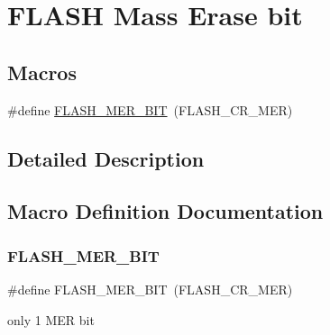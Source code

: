 \hypertarget{group___f_l_a_s_h_ex___mass_erase__bit}{}\section{F\+L\+A\+SH Mass Erase bit}
\label{group___f_l_a_s_h_ex___mass_erase__bit}
\subsection*{Macros}
\begin{DoxyCompactItemize}
\item 
\#define \mbox{\hyperlink{group___f_l_a_s_h_ex___mass_erase__bit_gae8edecf268bc993ff286fa1fabb486dd}{F\+L\+A\+S\+H\+\_\+\+M\+E\+R\+\_\+\+B\+IT}}~(F\+L\+A\+S\+H\+\_\+\+C\+R\+\_\+\+M\+ER)
\end{DoxyCompactItemize}


\subsection{Detailed Description}


\subsection{Macro Definition Documentation}
\mbox{\label{group___f_l_a_s_h_ex___mass_erase__bit_gae8edecf268bc993ff286fa1fabb486dd}} 
\subsubsection{\texorpdfstring{FLASH\_MER\_BIT}{FLASH\_MER\_BIT}}
{\footnotesize\ttfamily \#define F\+L\+A\+S\+H\+\_\+\+M\+E\+R\+\_\+\+B\+IT~(F\+L\+A\+S\+H\+\_\+\+C\+R\+\_\+\+M\+ER)}

only 1 M\+ER bit 